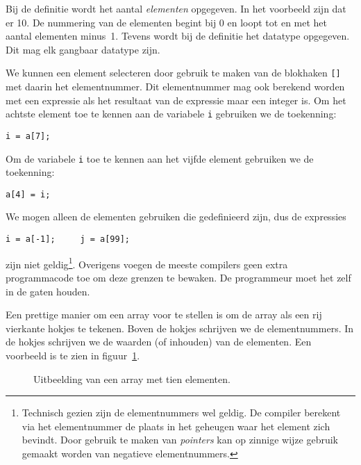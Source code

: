 Bij de definitie wordt het aantal \textsl{elementen} opgegeven. In het voorbeeld zijn dat er 10. De nummering van de elementen begint bij 0 en loopt tot en met het aantal elementen minus~1. Tevens wordt bij de definitie het datatype opgegeven. Dit mag elk gangbaar datatype zijn.

We kunnen een element selecteren door gebruik te maken van de blokhaken \texttt{[]}\indexop{[]} met daarin het elementnummer. Dit elementnummer mag ook berekend worden met een expressie als het resultaat van de expressie maar een integer is. Om het achtste element toe te kennen aan de variabele \texttt{i} gebruiken we de toekenning:

\begin{lstlisting}[style=lstoneline]
i = a[7];
\end{lstlisting}

Om de variabele \texttt{i} toe te kennen aan het vijfde element gebruiken we de toekenning:

\begin{lstlisting}[style=lstoneline]
a[4] = i;
\end{lstlisting}

We mogen alleen de elementen gebruiken die gedefinieerd zijn, dus de expressies

\begin{lstlisting}[style=lstoneline]
i = a[-1];     j = a[99];
\end{lstlisting}

zijn niet geldig\footnote{Technisch gezien zijn de elementnummers wel geldig. De compiler berekent via het elementnummer de plaats in het geheugen waar het element zich bevindt. Door gebruik te maken van \textsl{pointers} kan op zinnige wijze gebruik gemaakt worden van negatieve elementnummers.}. Overigens voegen de meeste compilers geen extra programmacode toe om deze grenzen te bewaken. De programmeur moet het zelf in de gaten houden.

Een prettige manier om een array voor te stellen is om de array als een rij vierkante hokjes te tekenen. Boven de hokjes schrijven we de elementnummers. In de hokjes schrijven we de waarden (of inhouden) van de elementen. Een voorbeeld is te zien in figuur~\ref{fig:arryinmem}.

\begin{figure}[!ht]
\centering
{}
\caption{Uitbeelding van een array met tien elementen.}
\label{fig:arryinmem}
\end{figure}

